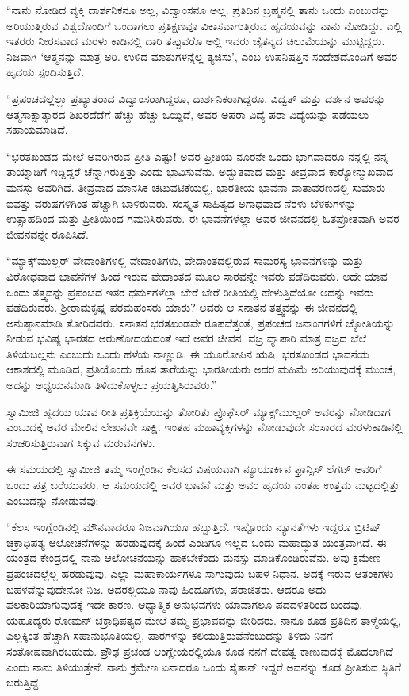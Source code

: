  “ನಾನು ನೋಡಿದ ವ್ಯಕ್ತಿ ದಾರ್ಶನಿಕನೂ ಅಲ್ಲ, ವಿದ್ವಾಂಸನೂ ಅಲ್ಲ. ಪ್ರತಿದಿನ ಬ್ರಹ್ಮನಲ್ಲಿ ತಾನು ಒಂದು ಎಂಬುದನ್ನು ಅರಿಯುತ್ತಿರುವ ವಿಶ್ವದೊಂದಿಗೆ ಒಂದಾಗಲು ಪ್ರತಿಕ್ಷಣವೂ ವಿಕಾಸವಾಗುತ್ತಿರುವ ಹೃದಯವನ್ನು ನಾನು ನೋಡಿದ್ದು. ಎಲ್ಲಿ ಇತರರು ನೀರಸವಾದ ಮರಳು ಕಾಡಿನಲ್ಲಿ ದಾರಿ ತಪ್ಪುವರೊ ಅಲ್ಲಿ ಇವರು ಚೈತನ್ಯದ ಚಿಲುಮೆಯನ್ನು ಮುಟ್ಟಿದ್ದರು. ನಿಜವಾಗಿ ‘ಆತ್ಮನನ್ನು ಮಾತ್ರ ಅರಿ. ಉಳಿದ ಮಾತುಗಳನ್ನೆಲ್ಲ ತ್ಯಜಿಸು’, ಎಂಬ ಉಪನಿಷತ್ತಿನ ಸಂದೇಶದೊಂದಿಗೆ ಅವರ ಹೃದಯ ಸ್ಪಂದಿಸುತ್ತಿದೆ.

 “ಪ್ರಪಂಚದಲ್ಲೆಲ್ಲಾ ಪ್ರಖ್ಯಾತರಾದ ವಿದ್ವಾಂಸರಾಗಿದ್ದರೂ, ದಾರ್ಶನಿಕರಾಗಿದ್ದರೂ, ವಿದ್ವತ್ ಮತ್ತು ದರ್ಶನ ಅವರನ್ನು ಆತ್ಮಸಾಕ್ಷಾತ್ಕಾರದ ಶಿಖರದೆಡೆಗೆ ಹೆಚ್ಚು ಹೆಚ್ಚು ಒಯ್ದಿದೆ, ಅವರ ಅಪರಾ ವಿದ್ಯೆ ಪರಾ ವಿದ್ಯೆಯನ್ನು ಪಡೆಯಲು ಸಹಾಯಮಾಡಿದೆ.

 “ಭರತಖಂಡದ ಮೇಲೆ ಅವರಿಗಿರುವ ಪ್ರೀತಿ ಎಷ್ಟು! ಅವರ ಪ್ರೀತಿಯ ನೂರನೇ ಒಂದು ಭಾಗವಾದರೂ ನನ್ನಲ್ಲಿ ನನ್ನ ತಾಯ್ನಾಡಿಗೆ ಇದ್ದಿದ್ದರೆ ಚೆನ್ನಾಗಿರುತ್ತಿತ್ತು ಎಂದು ಭಾವಿಸುವೆನು. ಅದ್ಭುತವಾದ ಮತ್ತು ತೀವ್ರವಾದ ಕಾರ‍್ಯೋನ್ಮುಖವಾದ ಮನಸ್ಸು ಅವರಿಗಿದೆ. ತೀವ್ರವಾದ ಮಾನಸಿಕ ಚಟುವಟಿಕೆಯಲ್ಲಿ, ಭಾರತೀಯ ಭಾವನಾ ವಾತಾವರಣದಲ್ಲಿ ಸುಮಾರು ಐವತ್ತು ವರುಷಗಳಿಗಿಂತ ಹೆಚ್ಚಾಗಿ ಬಾಳಿರುವರು. ಸಂಸ್ಕೃತ ಸಾಹಿತ್ಯದ ಅಗಾಧವಾದ ನೆರಳು ಬೆಳಕುಗಳನ್ನು ಉತ್ಸಾಹದಿಂದ ಮತ್ತು ಪ್ರೀತಿಯಿಂದ ಗಮನಿಸಿರುವರು. ಈ ಭಾವನೆಗಳೆಲ್ಲಾ ಅವರ ಜೀವನದಲ್ಲಿ ಓತಪ್ರೋತವಾಗಿ ಅವರ ಜೀವನವನ್ನೇ ರೂಪಿಸಿದೆ. 

 “ಮ್ಯಾಕ್ಸ್‌ಮುಲ್ಲರ್ ವೇದಾಂತಿಗಳಲ್ಲಿ ವೇದಾಂತಿಗಳು, ವೇದಾಂತದಲ್ಲಿರುವ ಸಾಮರಸ್ಯ ಭಾವನೆಗಳನ್ನು ಮತ್ತು ವಿರೋಧವಾದ ಭಾವನೆಗಳ ಹಿಂದೆ ಇರುವ ವೇದಾಂತದ ಮೂಲ ಸಾರವನ್ನೇ ಇವರು ಪಡೆದಿರುವರು. ಅದೇ ಯಾವ ಒಂದು ತತ್ತ್ವವನ್ನು ಪ್ರಪಂಚದ ಇತರ ಧರ್ಮಗಳೆಲ್ಲಾ ಬೇರೆ ಬೇರೆ ರೀತಿಯಲ್ಲಿ ಹೇಳುತ್ತಿದೆಯೋ ಅದನ್ನು ಇವರು ಪಡೆದಿರುವರು. ಶ‍್ರೀರಾಮಕೃಷ್ಣ ಪರಮಹಂಸರು ಯಾರು? ಅವರು ಆ ಸನಾತನ ತತ್ತ್ವವನ್ನು ಈ ಜೀವನದಲ್ಲಿ ಅನುಷ್ಠಾನಮಾಡಿ ತೋರಿದವರು. ಸನಾತನ ಭರತಖಂಡವೇ ರೂಪವೆತ್ತಂತೆ, ಪ್ರಪಂಚದ ಜನಾಂಗಗಳಿಗೆ ಜ್ಯೋತಿಯನ್ನು ನೀಡುವ ಭವಿಷ್ಯ ಭಾರತದ ಅರುಣೋದಯದಂತೆ ಇದೆ ಅವರ ಜೀವನ. ವಜ್ರ ವ್ಯಾಪಾರಿ ಮಾತ್ರ ವಜ್ರದ ಬೆಲೆ ತಿಳಿಯಬಲ್ಲನು ಎಂಬುದು ಒಂದು ಹಳೆಯ ನಾಣ್ಣುಡಿ. ಈ ಯೂರೋಪಿನ ಋಷಿ, ಭರತಖಂಡದ ಭಾವನೆಯ ಆಕಾಶದಲ್ಲಿ ಮೂಡಿದ, ಪ್ರತಿಯೊಂದು ಹೊಸ ತಾರೆಯನ್ನು ಭಾರತೀಯರು ಅದರ ಮಹಿಮೆ ಅರಿಯುವುದಕ್ಕೆ ಮುಂಚೆ, ಅದನ್ನು ಅಧ್ಯಯನಮಾಡಿ ತಿಳಿದುಕೊಳ್ಳಲು ಪ್ರಯತ್ನಿಸಿರುವರು.”

 ಸ್ವಾಮೀಜಿ ಹೃದಯ ಯಾವ ರೀತಿ ಪ್ರತಿಕ್ರಿಯೆಯನ್ನು ತೋರಿತು ಪ್ರೊಫೆಸರ್ ಮ್ಯಾಕ್ಸ್‌ಮುಲ್ಲರ್ ಅವರನ್ನು ನೋಡಿದಾಗ ಎಂಬುದಕ್ಕೆ ಅವರ ಮೇಲಿನ ಲೇಖನವೇ ಸಾಕ್ಷಿ. ಇಂತಹ ಮಹಾವ್ಯಕ್ತಿಗಳನ್ನು ನೋಡುವುದೇ ಸಂಸಾರದ ಮರಳುಕಾಡಿನಲ್ಲಿ ಸಂಚರಿಸುತ್ತಿರುವಾಗ ಸಿಕ್ಕುವ ಮರುವನಗಳು. 

 ಈ ಸಮಯದಲ್ಲಿ ಸ್ವಾಮೀಜಿ ತಮ್ಮ ಇಂಗ್ಲೆಂಡಿನ ಕೆಲಸದ ವಿಷಯವಾಗಿ ನ್ಯೂಯಾರ್ಕಿನ ಫ್ರಾನ್ಸಿಸ್ ಲೆಗಟ್ ಅವರಿಗೆ ಒಂದು ಪತ್ರ ಬರೆಯುವರು. ಆ ಸಮಯದಲ್ಲಿ ಅವರ ಭಾವನೆ ಮತ್ತು ಅವರ ಹೃದಯ ಎಂತಹ ಉತ್ತಮ ಮಟ್ಟದಲ್ಲಿತ್ತು ಎಂಬುದನ್ನು ನೋಡುವೆವು: 

 “ಕೆಲಸ ಇಂಗ್ಲೆಂಡಿನಲ್ಲಿ ಮೌನವಾದರೂ ನಿಜವಾಗಿಯೂ ಹಬ್ಬುತ್ತಿದೆ. ಇಷ್ಟೊಂದು ನ್ಯೂನತೆಗಳು ಇದ್ದರೂ ಬ್ರಿಟಿಷ್ ಚಕ್ರಾಧಿಪತ್ಯ ಆಲೋಚನೆಗಳನ್ನು ಹರಡುವುದಕ್ಕೆ ಹಿಂದೆ ಎಂದಿಗೂ ಇಲ್ಲದ ಒಂದು ಮಹಾದ್ಭುತ ಯಂತ್ರವಾಗಿದೆ. ಈ ಯಂತ್ರದ ಕೇಂದ್ರದಲ್ಲಿ ನಾನು ಆಲೋಚನೆಯನ್ನು ಹಾಕಬೇಕೆಂದು ಮನಸ್ಸು ಮಾಡಿಕೊಂಡಿರುವೆನು. ಅವು ಕ್ರಮೇಣ ಪ್ರಪಂಚದಲ್ಲೆಲ್ಲ ಹರಡುವುವು. ಎಲ್ಲಾ ಮಹಾಕಾರ್ಯಗಳೂ ಸಾಗುವುದು ಬಹಳ ನಿಧಾನ. ಅದಕ್ಕೆ ಇರುವ ಆತಂಕಗಳು ಬಹಳವೆನ್ನುವುದೇನೋ ನಿಜ. ಅದರಲ್ಲಿಯೂ ನಾವು ಹಿಂದೂಗಳು, ಪರಾಜಿತರು. ಆದರೂ ಅದು ಫಲಕಾರಿಯಾಗುವುದಕ್ಕೆ ಇದೇ ಕಾರಣ. ಆಧ್ಯಾತ್ಮಿಕ ಅನುಭವಗಳು ಯಾವಾಗಲೂ ಪದದಳಿತರಿಂದ ಬಂದವು. ಯಹೂದ್ಯರು ರೋಮನ್ ಚಕ್ರಾಧಿಪತ್ಯದ ಮೇಲೆ ತಮ್ಮ ಪ್ರಭಾವವನ್ನು ಬೀರಿದರು. ನಾನೂ ಕೂಡ ಪ್ರತಿದಿನ ತಾಳ್ಮೆಯಲ್ಲಿ, ಎಲ್ಲಕ್ಕಿಂತ ಹೆಚ್ಚಾಗಿ ಸಹಾನುಭೂತಿಯಲ್ಲಿ, ಪಾಠಗಳನ್ನು ಕಲಿಯುತ್ತಿರುವೆನೆಂಬುದನ್ನು ತಿಳಿದು ನಿನಗೆ ಸಂತೋಷವಾಗಿರಬಹುದು. ಪ್ರೌಢ ಪ್ರಚಂಡ ಆಂಗ್ಲೇಯರಲ್ಲಿಯೂ ಕೂಡ ನನಗೆ ದೇವತ್ವ ಕಾಣುವುದಕ್ಕೆ ಮೊದಲಾಗಿದೆ ಎಂದು ನಾನು ತಿಳಿಯುತ್ತೇನೆ. ನಾನು ಕ್ರಮೇಣ ಏನಾದರೂ ಒಂದು ಸೈತಾನ್ ಇದ್ದರೆ ಅವನನ್ನು ಕೂಡ ಪ್ರೀತಿಸುವ ಸ್ಥಿತಿಗೆ ಬರುತ್ತಿದ್ದೆ.

